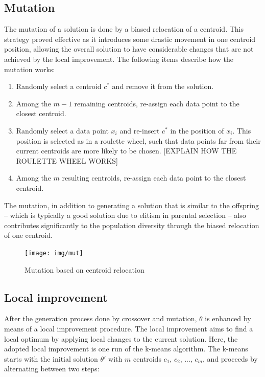 \subsection{Mutation}
\label{subsec:mutation}
The mutation of a solution is done by a biased relocation of a centroid. This strategy proved effective as it introduces some drastic movement in one centroid position, allowing the overall solution to have considerable changes that are not achieved by the local improvement. The following items describe how the mutation works:

\begin{enumerate}

	\item Randomly select a centroid $c^{*}$ and remove it from the solution.
	
	\item Among the $m-1$ remaining centroids, re-assign each data point to the closest centroid.
	
	\item Randomly select a data point $x_i$ and re-insert $c^{*}$ in the position of $x_i$. This position is selected as in a roulette wheel, such that data points far from their current centroids are more likely to be chosen. [EXPLAIN HOW THE ROULETTE WHEEL WORKS]
	
	\item Among the $m$ resulting centroids, re-assign each data point to the closest centroid.
		
\end{enumerate}

The mutation, in addition to generating a solution that is similar to the offspring -- which is typically a good solution due to elitism in parental selection -- also contributes significantly to the population diversity through the biased relocation of one centroid.

\begin{figure}[H]
  \begin{center}
    \texttt{[image: img/mut]}
    \caption{Mutation based on centroid relocation}\label{fig:mutation}
  \end{center}
\end{figure}

\subsection{Local improvement}
\label{subsec:local-improvement}
After the generation process done by crossover and mutation, $\theta$ is enhanced by means of a local improvement procedure. The local improvement aims to find a local optimum by applying local changes to the current solution. Here, the adopted local improvement is one run of the k-means algorithm. The k-means starts with the initial solution $\theta'$ with $m$ centroids $c_1$, $c_2$, ..., $c_m$, and proceeds by alternating between two steps:

